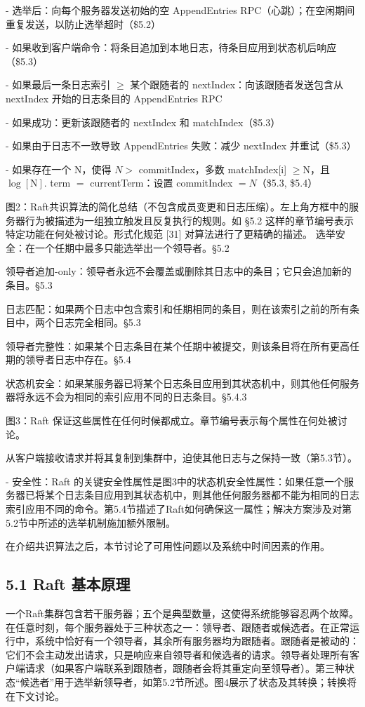 \documentclass[12pt,a4paper]{report} %
\begin{document}
- 选举后：向每个服务器发送初始的空 AppendEntries RPC（心跳）；在空闲期间重复发送，以防止选举超时（\$5.2）

- 如果收到客户端命令：将条目追加到本地日志，待条目应用到状态机后响应（\$5.3）

- 如果最后一条日志索引 $\geq$ 某个跟随者的 nextIndex：向该跟随者发送包含从 nextIndex 开始的日志条目的 AppendEntries RPC

- 如果成功：更新该跟随者的 nextIndex 和 matchIndex（\$5.3）

- 如果由于日志不一致导致 AppendEntries 失败：减少 nextIndex 并重试（\$5.3）

- 如果存在一个 N，使得 $N>$ commitIndex，多数 matchIndex[i] $\geq \mathrm{N}$，且 $\log [\mathrm{N}]$. term $=$ currentTerm：设置 commitIndex $=N$（\$5.3, \$5.4）

图2：Raft共识算法的简化总结（不包含成员变更和日志压缩）。左上角方框中的服务器行为被描述为一组独立触发且反复执行的规则。如 §5.2 这样的章节编号表示特定功能在何处被讨论。形式化规范 [31] 对算法进行了更精确的描述。
选举安全：在一个任期中最多只能选举出一个领导者。§5.2

领导者追加-only：领导者永远不会覆盖或删除其日志中的条目；它只会追加新的条目。§5.3

日志匹配：如果两个日志中包含索引和任期相同的条目，则在该索引之前的所有条目中，两个日志完全相同。§5.3

领导者完整性：如果某个日志条目在某个任期中被提交，则该条目将在所有更高任期的领导者日志中存在。§5.4

状态机安全：如果某服务器已将某个日志条目应用到其状态机中，则其他任何服务器将永远不会为相同的索引应用不同的日志条目。§5.4.3

图3：Raft 保证这些属性在任何时候都成立。章节编号表示每个属性在何处被讨论。

从客户端接收请求并将其复制到集群中，迫使其他日志与之保持一致（第5.3节）。

- 安全性：Raft 的关键安全性属性是图3中的状态机安全性属性：如果任意一个服务器已将某个日志条目应用到其状态机中，则其他任何服务器都不能为相同的日志索引应用不同的命令。第5.4节描述了Raft如何确保这一属性；解决方案涉及对第5.2节中所述的选举机制施加额外限制。

在介绍共识算法之后，本节讨论了可用性问题以及系统中时间因素的作用。

\subsection*{5.1 Raft 基本原理}

一个Raft集群包含若干服务器；五个是典型数量，这使得系统能够容忍两个故障。在任意时刻，每个服务器处于三种状态之一：领导者、跟随者或候选者。在正常运行中，系统中恰好有一个领导者，其余所有服务器均为跟随者。跟随者是被动的：它们不会主动发出请求，只是响应来自领导者和候选者的请求。领导者处理所有客户端请求（如果客户端联系到跟随者，跟随者会将其重定向至领导者）。第三种状态“候选者”用于选举新领导者，如第5.2节所述。图4展示了状态及其转换；转换将在下文讨论。
\end{document}
